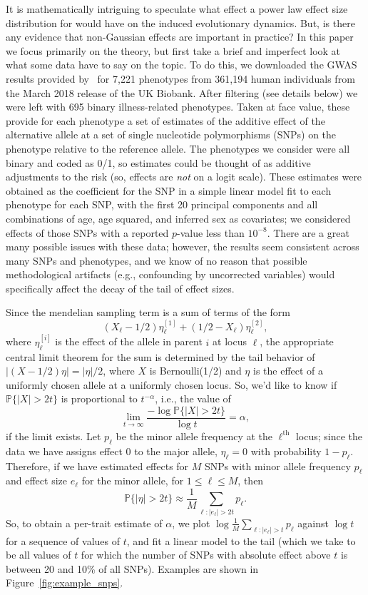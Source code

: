 \documentclass{article}
\renewcommand{\P}{\mathbb{P}}
\newcommand{\1}{\mathbbm{1}}
\theoremstyle{remark}
\theoremstyle{definition}
\begin{document}
It is mathematically intriguing to speculate what effect a power law effect size distribution
for would have on the induced evolutionary dynamics.
But, is there any evidence that non-Gaussian effects are important in practice?
In this paper we focus primarily on the theory,
but first take a brief and imperfect look at what some data have to say on the topic.
To do this, we downloaded the GWAS results provided by~\citet{biobankSNPs}
for 7,221 phenotypes from 361,194 human individuals from the March 2018 release of the UK Biobank.
After filtering (see details below) we were left with 695 binary illness-related phenotypes.
Taken at face value, these provide for each phenotype a set of estimates of the additive effect
of the alternative allele at a set of single nucleotide polymorphisms (SNPs)
on the phenotype relative to the reference allele.
The phenotypes we consider were all binary and coded as 0/1,
so estimates could be thought of as additive adjustments to the risk
(so, effects are \emph{not} on a logit scale).
These estimates were obtained as the coefficient for the SNP in a simple linear model
fit to each phenotype for each SNP,
with the first 20 principal components and all combinations of age, age squared, and inferred sex as covariates;
we considered effects of those SNPs with a reported $p$-value less than $10^{-8}$.
There are a great many possible issues with these data;
however, the results seem consistent across many SNPs and phenotypes,
and we know of no reason that possible methodological artifacts
(e.g., confounding by uncorrected variables)
would specifically affect the decay of the tail of effect sizes.

Since the mendelian sampling term is a sum of terms of the form
$$
    (X_\ell - 1/2) \eta_\ell^{[1]} + (1/2 - X_\ell) \eta_\ell^{[2]},
$$
where $\eta_\ell^{[i]}$ is the effect of the allele in parent $i$ at locus $\ell$,
the appropriate central limit theorem for the sum is determined by
the tail behavior of $|(X - 1/2) \eta| = |\eta|/2$,
where $X$ is Bernoulli(1/2) and $\eta$ is the effect
of a uniformly chosen allele at a uniformly chosen locus.
So, we'd like to know
if $\P\{|X|>2t\}$ is proportional to $t^{-\alpha}$,
i.e., the value of
$$
    \lim_{t \to \infty} \frac{ - \log \P\{ |X| > 2 t \} }{ \log t } = \alpha ,
$$
if the limit exists.
Let $p_\ell$ be the minor allele frequency at the $\ell^\text{th}$ locus;
since the data we have assigns effect 0 to the major allele,
$\eta_\ell = 0$ with probability $1-p_\ell$.
Therefore, if we have estimated effects for $M$ SNPs
with minor allele frequency $p_\ell$ and effect size $e_\ell$ for the minor allele,
for $1 \le \ell \le M$,
then
$$
    \P\{ |\eta| > 2t \} \approx \frac{1}{M} \sum_{\ell : |e_\ell| > 2t} p_\ell .
$$
So, to obtain a per-trait estimate of $\alpha$,
we plot $\log \frac{1}{M} \sum_{\ell : |e_\ell| > t} p_\ell$ against $\log t$
for a sequence of values of $t$,
and fit a linear model to the tail
(which we take to be all values of $t$ for which the number of SNPs with absolute effect above $t$
is between 20 and 10\% of all SNPs). 
Examples are shown in Figure~\ref{fig:example_snps}.
\end{document}
